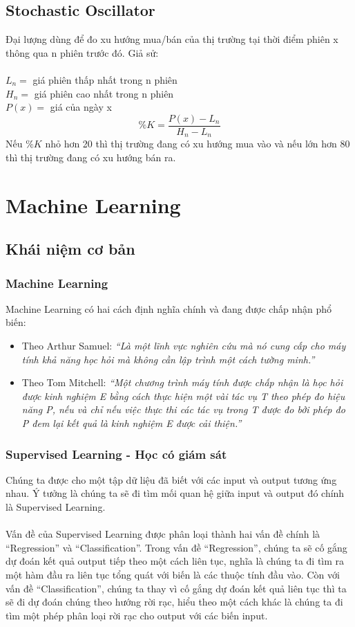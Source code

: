 \subsection{Stochastic Oscillator}
Đại lượng dùng để đo xu hướng mua/bán của thị trường tại thời điểm phiên x thông 
qua n phiên trước đó. Giả sử:\\\\
\tab $L_{n} = $ giá phiên thấp nhất trong n phiên\\
\tab $H_{n} = $ giá phiên cao nhất trong n phiên\\
\tab $P(x) = $ giá của ngày x\\
\[\%K=\frac{P(x)-L_{n}}{H_{n}-L_{n}}\]
Nếu $ \%K $ nhỏ hơn 20 thì thị trường đang có xu hướng mua vào và nếu lớn hơn 
80 thì thị trường đang có xu hướng bán ra.


\section{Machine Learning}

\subsection{Khái niệm cơ bản}
\subsubsection{Machine Learning}
Machine Learning có hai cách định nghĩa chính và đang được chấp nhận phổ biến:
\begin{itemize}
  \item Theo Arthur Samuel: \textit{``Là một lĩnh vực nghiên cứu mà nó cung cấp cho
  máy tính khả năng học hỏi mà không cần lập trình một cách tường minh.''}
  \item Theo Tom Mitchell: \textit{``Một chương trình máy tính được chấp nhận
  là học hỏi được kinh nghiệm E bằng cách thực hiện một vài tác vụ T theo phép đo hiệu
  năng P, nếu và chỉ nếu việc thực thi các tác vụ trong T được đo bởi phép đo P
  đem lại kết quả là kinh nghiệm E được cải thiện.''}
\end{itemize}
\subsubsection{Supervised Learning - Học có giám sát}
Chúng ta được cho một tập dữ liệu đã biết với các input và output tương ứng
nhau. Ý tưởng là chúng ta sẽ đi tìm mối quan hệ giữa input và output đó chính là
Supervised Learning.\\\\
Vấn đề của Supervised Learning được phân loại thành hai
vấn đề chính là “Regression” và “Classification”. Trong vấn đề “Regression”,
chúng ta sẽ cố gắng dự đoán kết quả output tiếp theo một cách liên tục, nghĩa là
chúng ta đi tìm ra một hàm đầu ra liên tục tổng quát với biến là các thuộc tính
đầu vào. Còn với vấn đề “Classification”, chúng ta thay vì cố gắng dự đoán kết
quả liên tục thì ta sẽ đi dự đoán chúng theo hướng rời rạc, hiểu theo một cách
khác là chúng ta đi tìm một phép phân loại rời rạc cho output với các biến
input.
